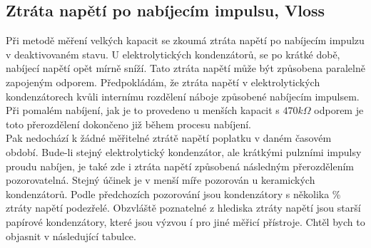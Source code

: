 \subsection{Ztráta napětí po nabíjecím impulsu, Vloss}
Při metodě měření velkých kapacit se zkoumá ztráta napětí po nabíjecím impulzu v deaktivovaném stavu.
U elektrolytických kondenzátorů, se po krátké době, nabíjecí napětí opět mírně sníží.
Tato ztráta napětí může být způsobena paralelně zapojeným odporem.
Předpokládám, že ztráta napětí v elektrolytických kondenzátorech kvůli internímu rozdělení náboje způsobené nabíjecím impulsem.
Při pomalém nabíjení, jak je to provedeno  u menších kapacit s \(470k\Omega\)  odporem
je toto přerozdělení dokončeno již během procesu nabíjení.\\ Pak nedochází k žádné měřitelné ztrátě napětí
poplatku v daném časovém období.
Bude-li stejný elektrolytický kondenzátor, ale krátkými pulzními impulsy proudu nabíjen, je také zde i ztráta napětí způsobená následným přerozdělením pozorovatelná.
Stejný účinek je v menší míře pozorován u keramických kondenzátorů.
Podle předchozích pozorování jsou kondenzátory s několika  \% ztráty napětí podezřelé.
Obzvláště poznatelné z hlediska ztráty napětí jsou starší papírové kondenzátory, které jsou výzvou í pro jiné měřicí přístroje. 
Chtěl bych to objasnit v následující tabulce.

